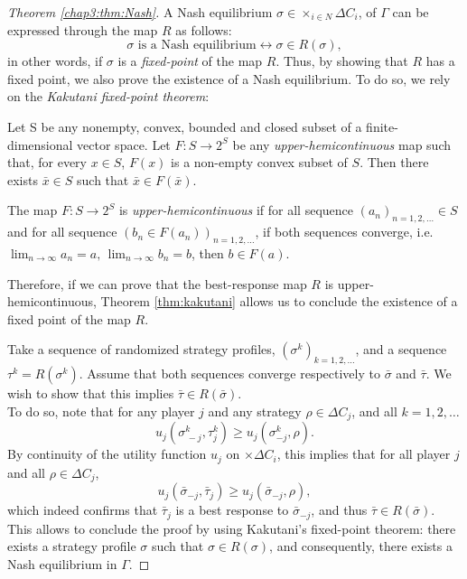 \begin{proof}[Theorem \ref{chap3:thm:Nash}]
A Nash equilibrium $\sigma \in \times_{i \in N} \Delta C_i$, of $\Gamma$ can be expressed through the map $R$ as follows:
$$\sigma \text{ is a Nash equilibrium} \leftrightarrow \sigma \in R(\sigma), $$
in other words, if $\sigma$ is a \emph{fixed-point} of the map $R$.
Thus,  by showing that $R$ has a fixed point, we also prove the existence of a Nash equilibrium.
To do so, we rely on the \emph{Kakutani fixed-point theorem}:

\begin{theorem}[Kakutani]
Let S be any nonempty, convex, bounded and closed subset of a finite-dimensional vector space. Let 
$F: S \rightarrow 2^S$ be any \emph{upper-hemicontinuous} map such that, for every $x \in S$, $F(x)$ is a non-empty convex subset of $S$. Then there exists $\bar{x} \in S$ such that $\bar{x} \in F(\bar{x})$.
\label{thm:kakutani}
\end{theorem} 

\begin{definition}
The map $F : S \rightarrow 2^S$ is \emph{upper-hemicontinuous} if 
for all sequence $(a_n)_{n = 1,2, \ldots} \in S$ and for all sequence $(b_n \in F(a_n))_{n = 1,2, \ldots}$, 
if both sequences converge, i.e. 
$\lim_{n \rightarrow \infty} a_n = a, \, \lim_{n \rightarrow \infty} b_n = b $, then $ b \in F(a). $
\end{definition} 


Therefore, if we can prove that the best-response map $R$ is upper-hemicontinuous, Theorem \ref{thm:kakutani} allows us to conclude the existence of a fixed point of the map $R$.

Take a sequence of randomized strategy profiles, $(\sigma^k)_{k = 1,2, \ldots}$, and a sequence $\tau^k = R(\sigma^k)$. Assume that both sequences converge respectively to $\bar{\sigma}$ and $\bar{\tau}$. We wish to show that this implies $\bar{\tau} \in R(\bar{\sigma})$.\\
To do so, note that for any player $j$ and any strategy $\rho \in \Delta C_j$, and all $k = 1,2, \ldots$ 
$$u_j(\sigma_{\, -j}^k, \tau^k_j) \geq u_j(\sigma_{ -j }^k, \rho). $$
By continuity of the utility function $u_j$ on $\times \Delta C_i$, this implies that for all player $j$ and all $\rho \in \Delta C_j$, 
$$ u_j(\bar{\sigma}_{ -j}, \bar{\tau}_j ) \geq u_j(\bar{\sigma}_{-j }, \rho),$$
which indeed confirms that $\bar{\tau}_j$ is a best response to $\bar{\sigma}_{ -j}$, and thus $\bar{\tau} \in R(\bar{\sigma})$. This allows to conclude the proof by using Kakutani's fixed-point theorem: there exists a strategy profile $\sigma$ such that $\sigma \in R(\sigma)$, and consequently, there exists a Nash equilibrium in $\Gamma$.
\end{proof}


